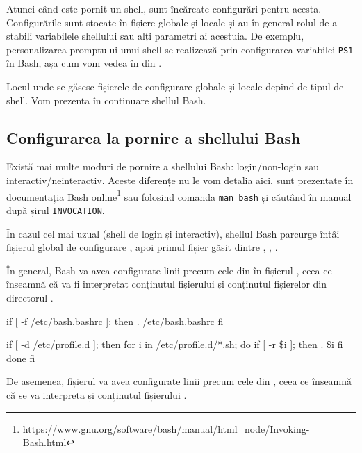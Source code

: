 Atunci când este pornit un shell, sunt încărcate configurări pentru acesta.
Configurările sunt stocate în fișiere globale și locale și au în general rolul
de a stabili variabilele shellului sau alți parametri ai acestuia. De exemplu,
personalizarea promptului unui shell se realizează prin configurarea variabilei
\texttt{PS1} în Bash, așa cum vom vedea în  din .

Locul unde se găsesc fișierele de configurare globale și locale depind de tipul de shell. Vom prezenta în continuare shellul Bash.

\subsection{Configurarea la pornire a shellului Bash}
\label{sec:cli:shell-start:config}

Există mai multe moduri de pornire a shellului Bash: login/non-login sau
interactiv/neinteractiv. Aceste diferențe nu le vom detalia aici, sunt
prezentate în documentația Bash online\footnote{\url{https://www.gnu.org/software/bash/manual/html\_node/Invoking-Bash.html}} sau folosind comanda \texttt{man bash} și căutând în manual după șirul \texttt{INVOCATION}.

În cazul cel mai uzual (shell de login și interactiv), shellul Bash parcurge
întâi fișierul global de configurare , apoi primul fișier găsit dintre
, , .

În general, Bash va avea configurate linii precum cele din  în fișierul
, ceea ce înseamnă că va fi interpretat conținutul fișierului
 și conținutul fișierelor din directorul .

\begin{screen}[caption={Secvență de configurare Bash (/etc/profile)},label={lst:cli:etc-profile}]
        if [ -f /etc/bash.bashrc ]; then
            . /etc/bash.bashrc
        fi


if [ -d /etc/profile.d ]; then
    for i in /etc/profile.d/*.sh; do
        if [ -r \$i ]; then
            . \$i
        fi
    done
fi
\end{screen}

De asemenea, fișierul  va avea configurate linii precum cele din , ceea ce înseamnă că se va interpreta și conținutul fișierului .

